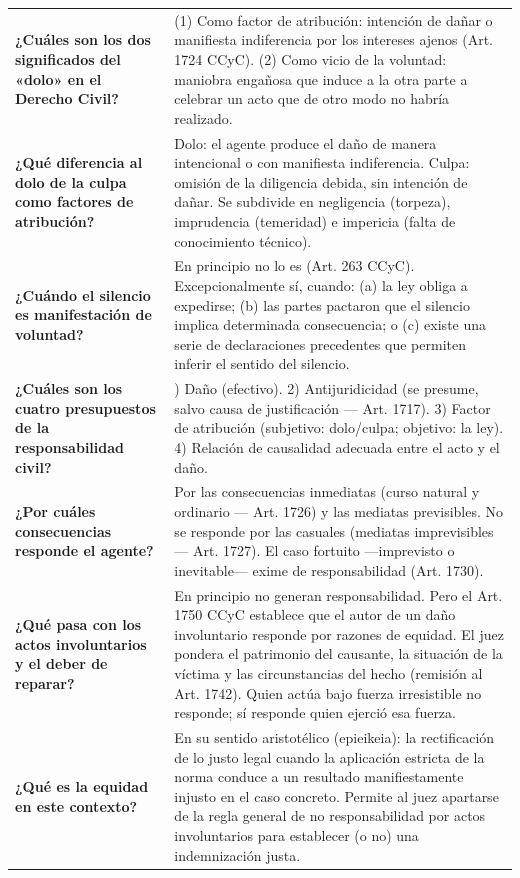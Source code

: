 \documentclass[12pt,oneside]{book}
\begin{document}
\begin{longtable}{
    >{\raggedright\arraybackslash}p{}
    >{\raggedright\arraybackslash}p{}
}
\textbf{¿Cuáles son los dos significados del «dolo» en el Derecho Civil?} &
(1) Como factor de atribución: intención de dañar o manifiesta indiferencia por los intereses ajenos (Art. 1724 CCyC). (2) Como vicio de la voluntad: maniobra engañosa que induce a la otra parte a celebrar un acto que de otro modo no habría realizado. \\

\textbf{¿Qué diferencia al dolo de la culpa como factores de atribución?} &
Dolo: el agente produce el daño de manera intencional o con manifiesta indiferencia. Culpa: omisión de la diligencia debida, sin intención de dañar. Se subdivide en negligencia (torpeza), imprudencia (temeridad) e impericia (falta de conocimiento técnico). \\

\textbf{¿Cuándo el silencio es manifestación de voluntad?} &
En principio no lo es (Art. 263 CCyC). Excepcionalmente sí, cuando: (a) la ley obliga a expedirse; (b) las partes pactaron que el silencio implica determinada consecuencia; o (c) existe una serie de declaraciones precedentes que permiten inferir el sentido del silencio. \\

\textbf{¿Cuáles son los cuatro presupuestos de la responsabilidad civil?} &
1) Daño (efectivo). 2) Antijuridicidad (se presume, salvo causa de justificación --- Art. 1717). 3) Factor de atribución (subjetivo: dolo/culpa; objetivo: la ley). 4) Relación de causalidad adecuada entre el acto y el daño. \\

\textbf{¿Por cuáles consecuencias responde el agente?} &
Por las consecuencias inmediatas (curso natural y ordinario --- Art. 1726) y las mediatas previsibles. No se responde por las casuales (mediatas imprevisibles --- Art. 1727). El caso fortuito ---imprevisto o inevitable--- exime de responsabilidad (Art. 1730). \\

\textbf{¿Qué pasa con los actos involuntarios y el deber de reparar?} &
En principio no generan responsabilidad. Pero el Art. 1750 CCyC establece que el autor de un daño involuntario responde por razones de equidad. El juez pondera el patrimonio del causante, la situación de la víctima y las circunstancias del hecho (remisión al Art. 1742). Quien actúa bajo fuerza irresistible no responde; sí responde quien ejerció esa fuerza. \\

\textbf{¿Qué es la equidad en este contexto?} &
En su sentido aristotélico (epieikeia): la rectificación de lo justo legal cuando la aplicación estricta de la norma conduce a un resultado manifiestamente injusto en el caso concreto. Permite al juez apartarse de la regla general de no responsabilidad por actos involuntarios para establecer (o no) una indemnización justa. \\


\end{longtable}
\end{document}
